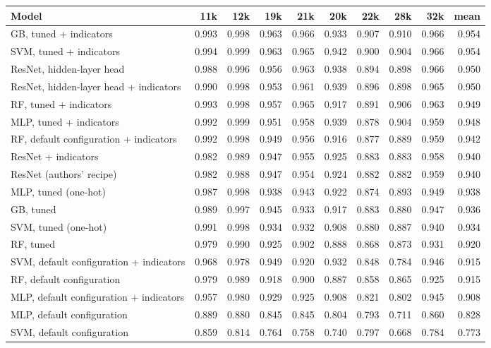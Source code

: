 \begin{tabular}{lrrrrrrrrr}
\toprule
Model & 11k & 12k & 19k & 21k & 20k & 22k & 28k & 32k & mean \\
\midrule
GB, tuned + indicators & 0.993 & 0.998 & 0.963 & 0.966 & 0.933 & 0.907 & 0.910 & 0.966 & 0.954 \\
SVM, tuned + indicators & 0.994 & 0.999 & 0.963 & 0.965 & 0.942 & 0.900 & 0.904 & 0.966 & 0.954 \\
ResNet, hidden-layer head & 0.988 & 0.996 & 0.956 & 0.963 & 0.938 & 0.894 & 0.898 & 0.966 & 0.950 \\
ResNet, hidden-layer head + indicators & 0.990 & 0.998 & 0.953 & 0.961 & 0.939 & 0.896 & 0.898 & 0.965 & 0.950 \\
RF, tuned + indicators & 0.993 & 0.998 & 0.957 & 0.965 & 0.917 & 0.891 & 0.906 & 0.963 & 0.949 \\
MLP, tuned + indicators & 0.992 & 0.999 & 0.951 & 0.958 & 0.939 & 0.878 & 0.904 & 0.959 & 0.948 \\
RF, default configuration + indicators & 0.992 & 0.998 & 0.949 & 0.956 & 0.916 & 0.877 & 0.889 & 0.959 & 0.942 \\
ResNet + indicators & 0.982 & 0.989 & 0.947 & 0.955 & 0.925 & 0.883 & 0.883 & 0.958 & 0.940 \\
ResNet (authors' recipe) & 0.982 & 0.988 & 0.947 & 0.954 & 0.924 & 0.882 & 0.882 & 0.959 & 0.940 \\
MLP, tuned (one-hot) & 0.987 & 0.998 & 0.938 & 0.943 & 0.922 & 0.874 & 0.893 & 0.949 & 0.938 \\
GB, tuned & 0.989 & 0.997 & 0.945 & 0.933 & 0.917 & 0.883 & 0.880 & 0.947 & 0.936 \\
SVM, tuned (one-hot) & 0.991 & 0.998 & 0.934 & 0.932 & 0.908 & 0.880 & 0.887 & 0.940 & 0.934 \\
RF, tuned & 0.979 & 0.990 & 0.925 & 0.902 & 0.888 & 0.868 & 0.873 & 0.931 & 0.920 \\
SVM, default configuration + indicators & 0.968 & 0.978 & 0.949 & 0.920 & 0.932 & 0.848 & 0.784 & 0.946 & 0.915 \\
RF, default configuration & 0.979 & 0.989 & 0.918 & 0.900 & 0.887 & 0.858 & 0.865 & 0.925 & 0.915 \\
MLP, default configuration + indicators & 0.957 & 0.980 & 0.929 & 0.925 & 0.908 & 0.821 & 0.802 & 0.945 & 0.908 \\
MLP, default configuration & 0.889 & 0.880 & 0.845 & 0.845 & 0.804 & 0.793 & 0.711 & 0.860 & 0.828 \\
SVM, default configuration & 0.859 & 0.814 & 0.764 & 0.758 & 0.740 & 0.797 & 0.668 & 0.784 & 0.773 \\
\bottomrule
\end{tabular}
